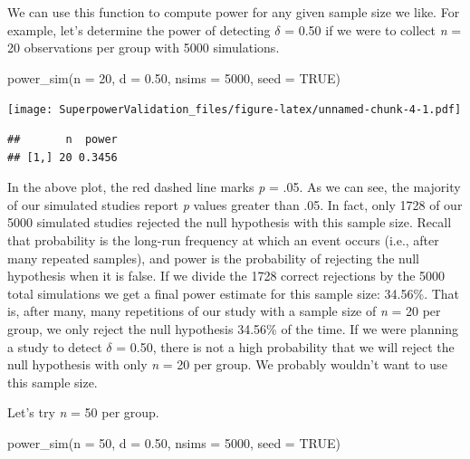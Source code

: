\documentclass[
]{book}
\newenvironment{Shaded}{\begin{snugshade}}{\end{snugshade}}
\newcommand{\AttributeTok}[1]{\textcolor[rgb]{0.77,0.63,0.00}{#1}}
\newcommand{\ConstantTok}[1]{\textcolor[rgb]{0.00,0.00,0.00}{#1}}
\newcommand{\DecValTok}[1]{\textcolor[rgb]{0.00,0.00,0.81}{#1}}
\newcommand{\FloatTok}[1]{\textcolor[rgb]{0.00,0.00,0.81}{#1}}
\newcommand{\FunctionTok}[1]{\textcolor[rgb]{0.00,0.00,0.00}{#1}}
\newcommand{\NormalTok}[1]{#1}
\begin{document}
We can use this function to compute power for any given sample size we like. For example, let's determine the power of detecting \(\delta\) = 0.50 if we were to collect \emph{n} = 20 observations per group with 5000 simulations.

\begin{Shaded}
\begin{Highlighting}[]
\FunctionTok{power\_sim}\NormalTok{(}\AttributeTok{n =} \DecValTok{20}\NormalTok{, }\AttributeTok{d =} \FloatTok{0.50}\NormalTok{, }\AttributeTok{nsims =} \DecValTok{5000}\NormalTok{, }\AttributeTok{seed =} \ConstantTok{TRUE}\NormalTok{)}
\end{Highlighting}
\end{Shaded}

\texttt{[image: SuperpowerValidation\_files/figure-latex/unnamed-chunk-4-1.pdf]}

\begin{verbatim}
##       n  power
## [1,] 20 0.3456
\end{verbatim}

In the above plot, the red dashed line marks \emph{p} = .05. As we can see, the majority of our simulated studies report \emph{p} values greater than .05. In fact, only 1728 of our 5000 simulated studies rejected the null hypothesis with this sample size. Recall that probability is the long-run frequency at which an event occurs (i.e., after many repeated samples), and power is the probability of rejecting the null hypothesis when it is false. If we divide the 1728 correct rejections by the 5000 total simulations we get a final power estimate for this sample size: 34.56\%. That is, after many, many repetitions of our study with a sample size of \emph{n} = 20 per group, we only reject the null hypothesis 34.56\% of the time. If we were planning a study to detect \(\delta\) = 0.50, there is not a high probability that we will reject the null hypothesis with only \emph{n} = 20 per group. We probably wouldn't want to use this sample size.

Let's try \emph{n} = 50 per group.

\begin{Shaded}
\begin{Highlighting}[]
\FunctionTok{power\_sim}\NormalTok{(}\AttributeTok{n =} \DecValTok{50}\NormalTok{, }\AttributeTok{d =} \FloatTok{0.50}\NormalTok{, }\AttributeTok{nsims =} \DecValTok{5000}\NormalTok{, }\AttributeTok{seed =} \ConstantTok{TRUE}\NormalTok{)}
\end{Highlighting}
\end{Shaded}
\end{document}

